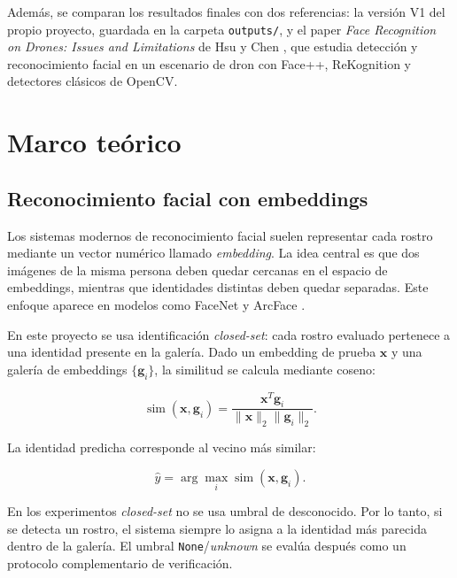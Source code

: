 \documentclass[11pt]{article}
\begin{document}
Adem\'as, se comparan los resultados finales con dos referencias: la versi\'on V1 del propio proyecto, guardada en la carpeta \texttt{outputs/}, y el paper \textit{Face Recognition on Drones: Issues and Limitations} de Hsu y Chen \cite{hsu2015issues}, que estudia detecci\'on y reconocimiento facial en un escenario de dron con Face++, ReKognition y detectores cl\'asicos de OpenCV.

\section{Marco te\'orico}
\label{sec:marco}

\subsection{Reconocimiento facial con embeddings}

Los sistemas modernos de reconocimiento facial suelen representar cada rostro mediante un vector num\'erico llamado \textit{embedding}. La idea central es que dos im\'agenes de la misma persona deben quedar cercanas en el espacio de embeddings, mientras que identidades distintas deben quedar separadas. Este enfoque aparece en modelos como FaceNet \cite{schroff2015facenet} y ArcFace \cite{deng2019arcface}.

En este proyecto se usa identificaci\'on \textit{closed-set}: cada rostro evaluado pertenece a una identidad presente en la galer\'ia. Dado un embedding de prueba $\mathbf{x}$ y una galer\'ia de embeddings $\{\mathbf{g}_i\}$, la similitud se calcula mediante coseno:

\begin{equation}
    \operatorname{sim}(\mathbf{x}, \mathbf{g}_i)
    =
    \frac{\mathbf{x}^{T}\mathbf{g}_i}{\|\mathbf{x}\|_2\|\mathbf{g}_i\|_2}.
\end{equation}

La identidad predicha corresponde al vecino m\'as similar:

\begin{equation}
    \hat{y} =
    \arg\max_i \operatorname{sim}(\mathbf{x}, \mathbf{g}_i).
\end{equation}

En los experimentos \textit{closed-set} no se usa umbral de desconocido. Por lo tanto, si se detecta un rostro, el sistema siempre lo asigna a la identidad m\'as parecida dentro de la galer\'ia. El umbral \texttt{None}/\textit{unknown} se eval\'ua despu\'es como un protocolo complementario de verificaci\'on.
\end{document}
